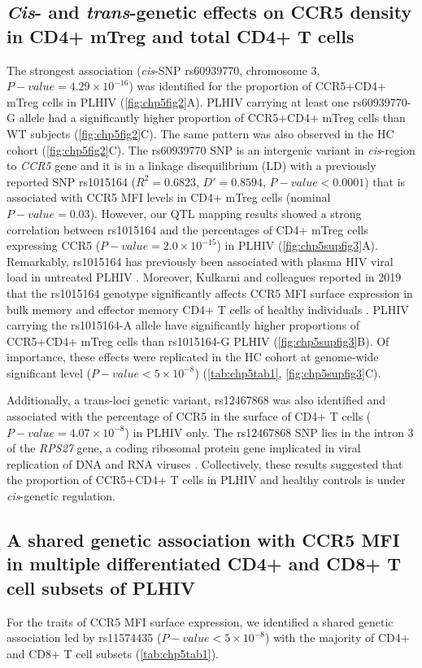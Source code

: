 \documentclass{book}
\begin{document}
\begin{refsection}
\subsection*{\textit{Cis}- and \textit{trans}-genetic effects on CCR5 density in CD4+ mTreg and total CD4+ T cells}
The strongest association (\textit{cis}-SNP rs60939770, chromosome 3, $P-value = 4.29 \times 10^{-16}$) was identified for the proportion of CCR5+CD4+ mTreg cells in PLHIV (\ref{fig:chp5fig2}A).
PLHIV carrying at least one rs60939770-G allele had a significantly higher proportion of CCR5+CD4+ mTreg cells than WT subjects (\ref{fig:chp5fig2}C).
The same pattern was also observed in the HC cohort (\ref{fig:chp5fig2}C).
The rs60939770 SNP is an intergenic variant in \textit{cis}-region to \textit{CCR5} gene and it is in a linkage disequilibrium (LD) with a previously reported SNP rs1015164 ($R^2 = 0.6823$, $D' = 0.8594$, $P-value < 0.0001$) that is associated with CCR5 MFI levels in CD4+ mTreg cells (nominal $P-value = 0.03$).
However, our QTL mapping results showed a strong correlation between rs1015164 and the percentages of CD4+ mTreg cells expressing CCR5 ($P-value = 2.0 \times 10^{-15}$) in PLHIV (\ref{fig:chp5supfig3}A).
Remarkably, rs1015164 has previously been associated with plasma HIV viral load in untreated PLHIV \cite{McLaren2015Polymorphisms}.
Moreover, Kulkarni and colleagues reported in 2019 that the rs1015164 genotype significantly affects CCR5 MFI surface expression in bulk memory and effector memory CD4+ T cells of healthy individuals \cite{Kulkarni2019CCR5AS}.
PLHIV carrying the rs1015164-A allele have significantly higher proportions of CCR5+CD4+ mTreg cells than rs1015164-G PLHIV (\ref{fig:chp5supfig3}B).
Of importance, these effects were replicated in the HC cohort at genome-wide significant level ($P-value < 5 \times 10^{-8}$) (\ref{tab:chp5tab1}, \ref{fig:chp5supfig3}C).

Additionally, a trans-loci genetic variant, rs12467868 was also identified and associated with the percentage of CCR5 in the surface of CD4+ T cells ($P-value = 4.07 \times 10^{-8}$) in PLHIV only.
The rs12467868 SNP lies in the intron 3 of the \textit{RPS27} gene, a coding ribosomal protein gene implicated in viral replication of DNA and RNA viruses \cite{Fernandez2011Conservation}.
Collectively, these results suggested that the proportion of CCR5+CD4+ T cells in PLHIV and healthy controls is under \textit{cis}-genetic regulation.

\subsection*{A shared genetic association with CCR5 MFI in multiple differentiated CD4+ and CD8+ T cell subsets of PLHIV}
For the traits of CCR5 MFI surface expression, we identified a shared genetic association led by rs11574435 ($P-value < 5 \times 10^{-8}$) with the majority of CD4+ and CD8+ T cell subsets (\ref{tab:chp5tab1}).


\end{refsection}
\end{document}
